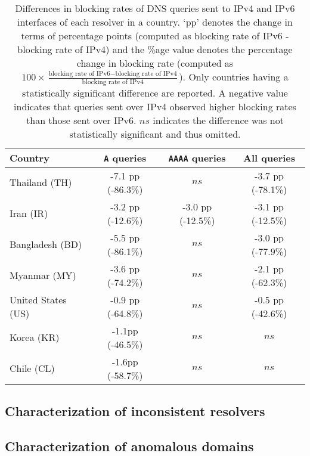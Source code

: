 \begin{table}[t]
  \centering
  \small
  \scalebox{\tabularscale} {
  \begin{tabular}{lccc}%
    \toprule
    {\bf Country}&{\bf {\tt A} queries }&{\bf {\tt AAAA} queries} & {\bf All queries}
    \\ \midrule
    Thailand (TH)      & -7.1 pp (-86.3\%) & $ns$              & -3.7 pp (-78.1\%) \\
    Iran (IR)          & -3.2 pp (-12.6\%) & -3.0 pp (-12.5\%) & -3.1 pp (-12.5\%) \\ 
    Bangladesh (BD)    & -5.5 pp (-86.1\%) & $ns$              & -3.0 pp (-77.9\%) \\
    Myanmar (MY)       & -3.6 pp (-74.2\%) & $ns$              & -2.1 pp (-62.3\%) \\
    United States (US) & -0.9 pp (-64.8\%) & $ns$              & -0.5 pp (-42.6\%) \\
    \midrule
    Korea (KR)         & -1.1pp (-46.5\%) & $ns$    & $ns$ \\
    Chile (CL)         & -1.6pp (-58.7\%)  & $ns$    & $ns$ \\
    \bottomrule
  \end{tabular}
  }
  \caption{Differences in blocking rates of DNS queries sent to IPv4 and IPv6
  interfaces of each resolver in a country. `pp' denotes the change in
  terms of percentage points (computed as blocking rate of IPv6 - blocking
  rate of IPv4) and the \%age value denotes the percentage change in blocking rate
  (computed as 
  $
  100 \times \frac{\text{blocking rate of IPv6} - \text{blocking rate of IPv4}}
  {\text{blocking rate of IPv4}}
  $). 
  Only countries having a statistically
  significant difference are reported. A negative value indicates that queries
  sent over IPv4 observed higher blocking rates than those sent over IPv6. $ns$
  indicates the difference was not statistically significant and thus omitted.}
  \label{tab:infrastructure:countries}
\end{table}

\subsection{Characterization of inconsistent resolvers}
\label{sec:infrastructure:resolvers}


\subsection{Characterization of anomalous domains}
\label{sec:infrastructure:domains}

